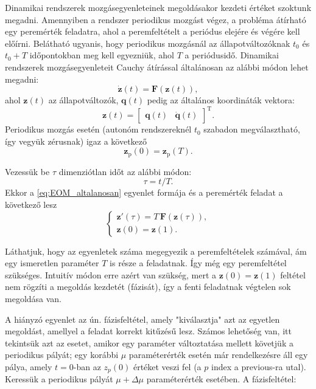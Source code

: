 Dinamikai rendszerek mozgásegyenleteinek megoldásakor kezdeti értéket szoktunk megadni.
Amennyiben a rendszer periodikus mozgást végez, a probléma átírható egy peremérték feladatra, ahol a peremfeltételt a periódus elejére és végére kell előírni.
Belátható ugyanis, hogy periodikus mozgásnál az állapotváltozóknak $t_0$ és $t_0 + T$ időpontokban meg kell egyezniük, ahol $T$ a periódusidő.
Dinamikai rendszerek mozgásegyenleteit Cauchy átírással általánosan az alábbi módon lehet megadni:
\begin{equation}
\dot{\mathbf{z}}(t) = \mathbf{F}(\mathbf{z}(t)),
\label{eq:EOM_altalanosan}
\end{equation}
ahol $\mathbf{z}(t)$ az állapotváltozók, $\mathbf{q}(t)$ pedig az általános koordináták vektora:
\begin{equation}
\mathbf{z}(t) = \begin{bmatrix}
\mathbf{q}(t) & \dot{\mathbf{q}}(t)
\end{bmatrix}^\mathrm{T}.
\end{equation}
Periodikus mozgás esetén (autonóm rendszereknél $t_0$ szabadon megválasztható, így vegyük zérusnak) igaz a következő
\begin{equation}
\mathbf{z}_\mathrm{p}(0) = \mathbf{z}_\mathrm{p}(T) .
\end{equation}

Vezessük be $\tau$ dimenziótlan időt az alábbi módon:
\begin{equation}
\tau =  t/T.
\end{equation}
Ekkor a \eqref{eq:EOM_altalanosan} egyenlet formája és a peremérték feladat a következő lesz
\begin{equation}
\begin{cases}
\mathbf{z}'(\tau) = T\,\mathbf{F}(\mathbf{z}(\tau)), \\
\mathbf{z}(0) = \mathbf{z}(1).
\end{cases}
\label{eq:EOM_dimtalan}
\end{equation}

Láthatjuk, hogy az egyenletek száma megegyezik a peremfeltételek számával, ám egy ismeretlen paraméter $T$ is része a feladatnak. Így még egy peremfeltétel szükséges. Intuitív módon erre azért van szükség, mert a $\mathbf{z}(0) = \mathbf{z}(1)$ feltétel nem rögzíti a megoldás kezdetét (fázisát), így a fenti feladatnak végtelen sok megoldása van.

A hiányzó egyenlet az ún. fázisfeltétel, amely "kiválasztja" azt az egyetlen megoldást, amellyel a feladat korrekt kitűzésű lesz. Számos lehetőség van, itt tekintsük azt az esetet, amikor egy paraméter változtatása mellett követjük a periodikus pályát; egy korábbi $\mu$ paraméterérték esetén már rendelkezésre áll egy pálya, amely $t=0$-ban az $z_p(0)$ értéket veszi fel (a $p$ index a previous-ra utal). Keressük a periodikus pályát $\mu+ \Delta \mu$ paraméterérték esetében. A fázisfeltétel:

